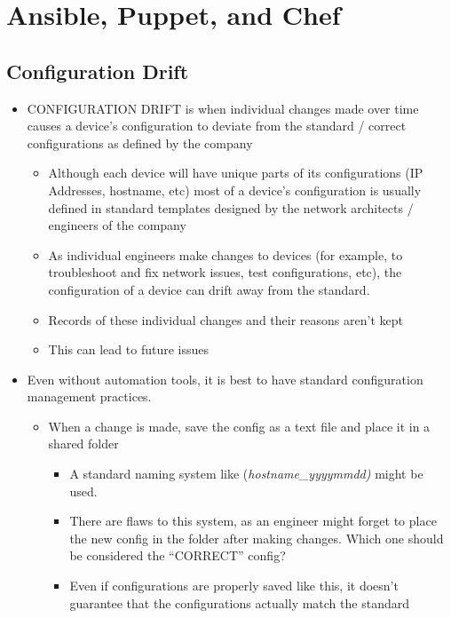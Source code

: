 \chapter{Ansible, Puppet, and Chef}\label{ansible-puppet-and-chef}

\section{Configuration Drift}\label{configuration-drift}

\begin{itemize}
\tightlist
\item
  CONFIGURATION DRIFT is when individual changes made over time causes a
  device's configuration to deviate from the standard / correct
  configurations as defined by the company

  \begin{itemize}
  \tightlist
  \item
    Although each device will have unique parts of its configurations
    (IP Addresses, hostname, etc) most of a device's configuration is
    usually defined in standard templates designed by the network
    architects / engineers of the company
  \item
    As individual engineers make changes to devices (for example, to
    troubleshoot and fix network issues, test configurations, etc), the
    configuration of a device can drift away from the standard.
  \item
    Records of these individual changes and their reasons aren't kept
  \item
    This can lead to future issues
  \end{itemize}
\item
  Even without automation tools, it is best to have standard
  configuration management practices.

  \begin{itemize}
  \tightlist
  \item
    When a change is made, save the config as a text file and place it
    in a shared folder

    \begin{itemize}
    \tightlist
    \item
      A standard naming system like (\emph{hostname\_yyyymmdd)} might be
      used.
    \item
      There are flaws to this system, as an engineer might forget to
      place the new config in the folder after making changes. Which one
      should be considered the ``CORRECT'' config?
    \item
      Even if configurations are properly saved like this, it doesn't
      guarantee that the configurations actually match the standard
    \end{itemize}
  \end{itemize}
\end{itemize}

